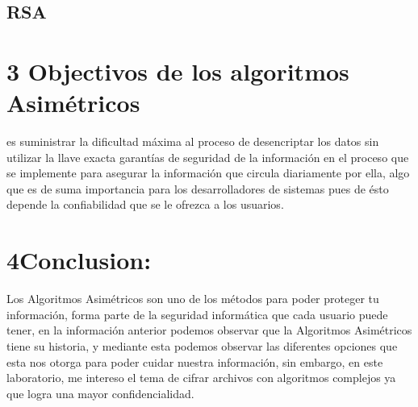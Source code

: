 \documentclass[12pt]{article}
\begin{document}
\par

\par

\subsection{RSA}

\vspace{\baselineskip}
\section*{3 Objectivos de los algoritmos Asimétricos}
es suministrar la dificultad máxima al proceso de desencriptar los datos sin utilizar la llave exacta garantías  de seguridad de la información en el proceso que se implemente para asegurar la información que circula diariamente por ella, algo que es de suma importancia para los desarrolladores de sistemas pues de ésto depende la confiabilidad que se le ofrezca a los usuarios.\par

\section*{4\hspace*{10pt}Conclusion:}

\vspace{\baselineskip}
Los Algoritmos Asimétricos son uno de los métodos para poder proteger tu información, forma parte de la seguridad informática que cada usuario puede tener, en la información anterior podemos observar que la Algoritmos Asimétricos tiene su historia, y mediante esta podemos observar las diferentes opciones que esta nos otorga para poder cuidar nuestra información, sin embargo, en este laboratorio, me intereso el tema de cifrar archivos con algoritmos complejos ya que logra una mayor confidencialidad.\par


\printbibliography
\end{document}
